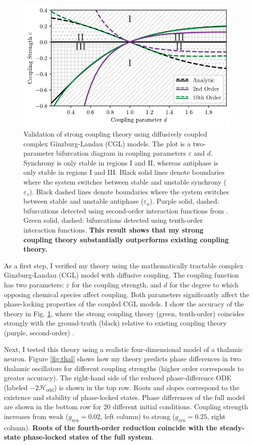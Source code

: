 \documentclass[a4paper,11pt]{article}
\newcommand{\ve}{\varepsilon}
\newcommand{\h}{\mathcal{H}}
\begin{document}
	\begin{figure}[ht!]
		\centering
		\includegraphics[width=.75\textwidth]{figures/cgl_2par_edited.pdf}
		\caption{Validation of strong coupling theory using diffusively coupled complex Ginzburg-Landau (CGL) models. The plot is a two-parameter bifurcation diagram in coupling parameters $\ve$ and $d$. Synchrony is only stable in regions I and II, whereas antiphase is only stable in regions I and III. Black solid lines denote boundaries where the system switches between stable and unstable synchrony ($\ve_s$). Black dashed lines denote boundaries where the system switches between stable and unstable antiphase ($\ve_a$). Purple solid, dashed: bifurcations detected using second-order interaction functions from \cite{wilson2019phase}. Green solid, dashed: bifurcations detected using tenth-order interaction functions. \textbf{This result shows that my strong coupling theory substantially outperforms existing coupling theory.}}\label{fig:cgl}
	\end{figure}
	
	As a first step, I verified my theory using the mathematically tractable complex Ginzburg-Landau (CGL) model with diffusive coupling. The coupling function has two parameters: $\ve$ for the coupling strength, and $d$ for the degree to which opposing chemical species affect coupling. Both parameters significantly affect the phase-locking properties of the coupled CGL models. I show the accuracy of the theory in Fig. \ref{fig:cgl}, where the strong coupling theory (green, tenth-order) coincides strongly with the ground-truth (black) relative to existing coupling theory (purple, second-order) \cite{wilson2019phase}. 
	
	Next, I tested this theory using a realistic four-dimensional model of a thalamic neuron. Figure \ref{fig:thal} shows how my theory predicts phase differences in two thalamic oscillators for different coupling strengths (higher order corresponds to greater accuracy). The right-hand side of the reduced phase-difference ODE (labeled $-2\h_{\text{odd}}$) is shown in the top row. Roots and slopes correspond to the existence and stability of phase-locked states. Phase differences of the full model are shown in the bottom row for 20 different initial conditions. Coupling strength increases from weak ($g_\text{syn}=0.02$, left column) to strong ($g_\text{syn}=0.25$, right column). \textbf{Roots of the fourth-order reduction coincide with the steady-state phase-locked states of the full system}.
	
\end{document}
